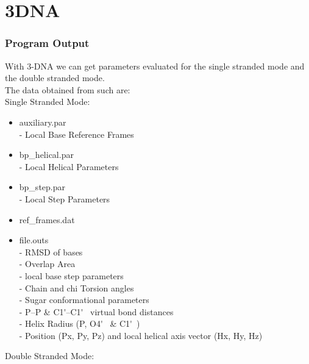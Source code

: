 \part{3DNA}

\section{Program Output}

With 3-DNA  we can  get parameters evaluated  for the  single stranded
mode and  the double stranded mode.\\
The data obtained  from such are:\\

Single Stranded Mode:\\
\begin{itemize}
\item auxiliary.par\\
                - Local Base Reference Frames
\item bp\_helical.par\\  
                - Local Helical Parameters
\item bp\_step.par\\     
                - Local Step Parameters 
\item ref\_frames.dat

\item file.outs \\     
                - RMSD of bases\\
                - Overlap Area\\
		- local base step parameters\\
		- Chain and chi Torsion angles\\
		- Sugar conformational parameters\\
		- P--P \& C1\'{}--{}C1\'~ virtual bond distances\\
		- Helix Radius (P, O4\'~ \& C1\'~)\\
		- Position (Px, Py, Pz) and local helical axis vector (Hx, Hy, Hz)\\
\end{itemize}

Double Stranded Mode:\\


